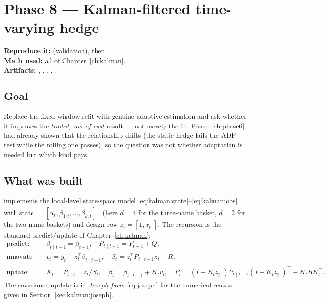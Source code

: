 \section{Phase 8 --- Kalman-filtered time-varying hedge}
\label{ch:phase8}

\textbf{Reproduce it:}  (validation), then
.\\
\textbf{Math used:} all of Chapter~\ref{ch:kalman}.\\
\textbf{Artifacts:} , ,
,
, .

\subsection{Goal}

Replace the fixed-window refit with genuine adaptive estimation and ask whether it
improves the \emph{traded, net-of-cost} result --- not merely the fit. Phase~\ref{ch:phase6}
had already shown that the relationship drifts (the static hedge fails the ADF test while
the rolling one passes), so the question was not whether adaptation is needed but which
kind pays.

\subsection{What was built}

 implements the local-level state-space model
\eqref{eq:kalman:state}--\eqref{eq:kalman:obs} with state $=[\alpha_t,\beta_{1,t},\dots,
\beta_{k,t}]^{\top}$ (here $d=4$ for the three-name basket, $d=2$ for the two-name
baskets) and design row $z_t=[1,x_t^{\top}]$. The recursion is the standard
predict/update of Chapter~\ref{ch:kalman}:
\begin{align*}
  \text{predict:}\quad & \beta_{t\mid t-1}=\beta_{t-1},\quad P_{t\mid t-1}=P_{t-1}+Q,\\
  \text{innovate:}\quad & v_t = y_t - z_t^{\top}\beta_{t\mid t-1},\quad
  S_t = z_t^{\top}P_{t\mid t-1}z_t + R,\\
  \text{update:}\quad & K_t = P_{t\mid t-1}z_t/S_t,\quad
  \beta_t = \beta_{t\mid t-1} + K_t v_t,\quad
  P_t = (I-K_tz_t^{\top})P_{t\mid t-1}(I-K_tz_t^{\top})^{\top} + K_tRK_t^{\top}.
\end{align*}
The covariance update is in \emph{Joseph form} \eqref{eq:joseph} for the numerical reason
given in Section~\ref{sec:kalman:joseph}.


